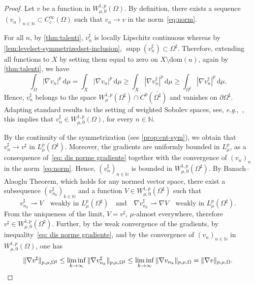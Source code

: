 \documentclass[a4paper,12pt,reqno]{amsart}
\numberwithin{equation}{section}
\newcommand{\pa}{{\partial}}
\newcommand{\di}{\,\mathrm{d}}
\newcommand{\Om}{\Omega}
\DeclareMathOperator{\supp}{supp}
\theoremstyle{plain}
\theoremstyle{definition}
\begin{document}
\begin{proof}

Let $v$ be a function in $W^{1,p}_{\mu,0}(\Om)$. By definition, there exists a sequence $(v_n)_{n \in \mathbb{N}}\subset C^\infty_c(\Om)$ such that $v_n \to v$ in the norm~\eqref{eq:norm}. 

For all $n$, by \cref{thm:talenti}, ${v}^\sharp_n$ is locally Lipschitz continuous whereas by \cref{lem:levelset-symmetrizedset-inclusion}, $\supp(v_n^\sharp)\subset \overline{\Omega^\sharp}$. Therefore, extending all functions to $X$ by setting them equal to zero on $X\setminus \mathrm{dom}(u)$, again by \cref{thm:talenti}, we have
%
\begin{equation}\label{eq: dis norme gradiente}
\int_{\Omega} |\nabla {v}_n|^p\di\mu
=
\int_{X} |\nabla {v}_n|^p\di\mu
\geq
\int_{X}|\nabla {v}_n^\sharp|^p\di\mu
\ge
\int_{\Omega^\sharp}|\nabla {v}_n^\sharp|^p\di\mu.
\end{equation}
%
Hence, $v^\sharp_n$ belongs to the space $W^{1,p}_\mu(\Om^\sharp)\cap C^0(\overline{\Om^\sharp})$ and vanishes on $\pa\Om^\sharp$. Adapting standard results to the setting of weighted Sobolev spaces, see, \emph{e.g.},~\cite[Thm.~9.17 and Rem.~19]{Bre10book}, this implies that $v_n^\sharp \in W^{1,p}_{\mu,0}(\Om)$, for every $n \in \mathbb{N}$.

By the continuity of the symmetrization (see \cref{prop:cnt-sym}), we obtain that $v_n^\sharp\to v^\sharp$ in $L^p_\mu(\Om^\sharp)$. Moreover, the gradients are uniformly bounded in $L^p_\mu$, as a consequence of~\eqref{eq: dis norme gradiente} together with the convergence of $(v_n)_n$ in the norm~\eqref{eq:norm}. Hence, $(v_n^\sharp)_{n \in \mathbb{N}}$ is bounded in $W^{1,p}_{\mu,0}(\Om^\sharp)$. By Banach--Alaoglu Theorem, which holds for any normed vector space, there exist a subsequence $(v_{n_k}^\sharp)_{k\in\mathbb{N}}$ and a function $V \in W^{1,p}_{\mu,0}(\Om^\sharp)$ such that
%
\[
v_{n_k}^\sharp\rightharpoonup V \quad \text{weakly in } L^p_\mu(\Om^\sharp)\quad \text{and} \quad \nabla v_{n_k}^\sharp\rightharpoonup\nabla V\quad \text{weakly in } L^p_\mu(\Om^\sharp).
\]
%
From the uniqueness of the limit, $V=v^\sharp$, $\mu$-almost everywhere, therefore $v^\sharp \in W^{1,p}_{\mu,0}(\Omega^\sharp)$. Further, by the weak convergence of the gradients, by inequality~\eqref{eq: dis norme gradiente}, and by the convergence of $(v_n)_{n\in\mathbb{N}}$ in $W^{1,p}_{\mu,0}(\Om)$, one has
\[
\|\nabla v^\sharp\|_{p,\mu,\Om^\sharp}
\leq 
\liminf_{k \to \infty}\|\nabla v_{n_k}^\sharp\|_{p,\mu,\Om^\sharp}
\leq
\liminf_{k\to \infty}\|\nabla v_{n_k}\|_{p,\mu,\Om}
=
\|\nabla v\|_{p,\mu,\Om}.
\qedhere
\]
\end{proof}
\end{document}
